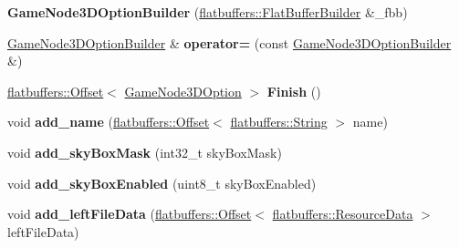 \begin{DoxyCompactItemize}
{\bfseries Game\+Node3\+D\+Option\+Builder} (\hyperlink{classflatbuffers_1_1FlatBufferBuilder}{flatbuffers\+::\+Flat\+Buffer\+Builder} \&\+\_\+fbb)
\item 
\mbox{\label{structflatbuffers_1_1GameNode3DOptionBuilder_afd011ea3d9112fd1ba8b7d993a74f5e4}} 
\hyperlink{structflatbuffers_1_1GameNode3DOptionBuilder}{Game\+Node3\+D\+Option\+Builder} \& {\bfseries operator=} (const \hyperlink{structflatbuffers_1_1GameNode3DOptionBuilder}{Game\+Node3\+D\+Option\+Builder} \&)
\item 
\mbox{\label{structflatbuffers_1_1GameNode3DOptionBuilder_a7d80223a44c64eafa01b208cd3f773ff}} 
\hyperlink{structflatbuffers_1_1Offset}{flatbuffers\+::\+Offset}$<$ \hyperlink{structflatbuffers_1_1GameNode3DOption}{Game\+Node3\+D\+Option} $>$ {\bfseries Finish} ()
\item 
\mbox{\label{structflatbuffers_1_1GameNode3DOptionBuilder_a25a56460a7eba028eaffec8fe47cb77d}} 
void {\bfseries add\+\_\+name} (\hyperlink{structflatbuffers_1_1Offset}{flatbuffers\+::\+Offset}$<$ \hyperlink{structflatbuffers_1_1String}{flatbuffers\+::\+String} $>$ name)
\item 
\mbox{\label{structflatbuffers_1_1GameNode3DOptionBuilder_aefb3c9e9c8c64768e4cdee629ce92241}} 
void {\bfseries add\+\_\+sky\+Box\+Mask} (int32\+\_\+t sky\+Box\+Mask)
\item 
\mbox{\label{structflatbuffers_1_1GameNode3DOptionBuilder_a944f27de427ea6a7b1f48340d83828dd}} 
void {\bfseries add\+\_\+sky\+Box\+Enabled} (uint8\+\_\+t sky\+Box\+Enabled)
\item 
\mbox{\label{structflatbuffers_1_1GameNode3DOptionBuilder_aacdd1c7fdbfa3c948e5015455dd48372}} 
void {\bfseries add\+\_\+left\+File\+Data} (\hyperlink{structflatbuffers_1_1Offset}{flatbuffers\+::\+Offset}$<$ \hyperlink{structflatbuffers_1_1ResourceData}{flatbuffers\+::\+Resource\+Data} $>$ left\+File\+Data)
\item 
\mbox{\label{structflatbuffers_1_1GameNode3DOptionBuilder_acf79802464aaab7d86e77c6a89d4b79a}} 

\end{DoxyCompactItemize}
